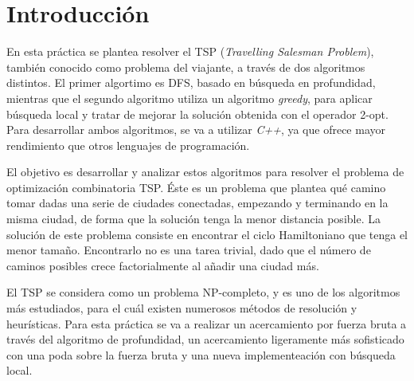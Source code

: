 \documentclass{uc3mpracticas}
\begin{document}
  \frontmatter



  \vspace{55mm}


  \newpage

  \tableofcontents

\newpage

  \mainmatter

  \section{Introducción}

  En esta práctica se plantea resolver el TSP (\textit{Travelling Salesman Problem}), también conocido como problema del viajante, a través de dos algoritmos distintos. El primer algortimo es DFS, basado en búsqueda en profundidad, mientras que el segundo algoritmo utiliza un algoritmo \textit{greedy}, para aplicar búsqueda local y tratar de mejorar la solución obtenida con el operador 2-opt. Para desarrollar ambos algoritmos, se va a utilizar \textit{C++}, ya que ofrece mayor rendimiento que otros lenguajes de programación.

  \vspace{2mm}

  El objetivo es desarrollar y analizar estos algoritmos para resolver el problema de optimización combinatoria TSP. Éste es un problema que plantea qué camino tomar dadas una serie de ciudades conectadas, empezando y terminando en la misma ciudad, de forma que la solución tenga la menor distancia posible. La solución de este problema consiste en encontrar el ciclo Hamiltoniano que tenga el menor tamaño. Encontrarlo no es una tarea trivial, dado que el número de caminos posibles crece factorialmente al añadir una ciudad más.

  \vspace{2mm}

  El TSP se considera como un problema NP-completo, y es uno de los algoritmos más estudiados, para el cuál existen numerosos métodos de resolución y heurísticas. Para esta práctica se va a realizar un acercamiento por fuerza bruta a través del algoritmo de profundidad, un acercamiento ligeramente más sofisticado con una poda sobre la fuerza bruta y una nueva implementeación con búsqueda local.
\end{document}
